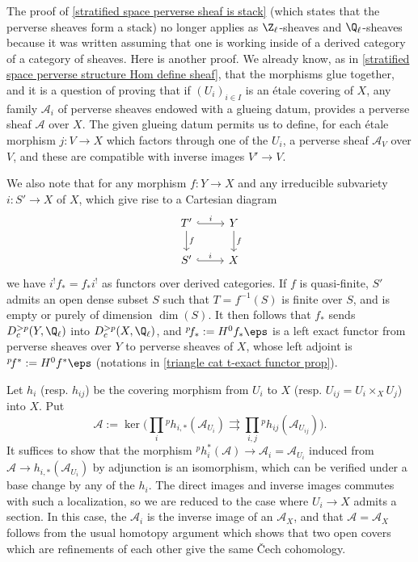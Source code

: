 \begin{remark}
The proof of \cref{stratified space perverse sheaf is stack} (which states that the perverse sheaves form a stack) no longer applies as $\Z_\ell$-sheaves and $\Q_\ell$-sheaves because it was written assuming that one is working inside of a derived category of a category of sheaves. Here is another proof. We already know, as in \cref{stratified space perverse structure Hom define sheaf}, that the morphisms glue together, and it is a question of proving that if $(U_i)_{i\in I}$ is an \'etale covering of $X$, any family $\mathscr{A}_i$ of perverse sheaves endowed with a glueing datum, provides a perverse sheaf $\mathscr{A}$ over $X$. The given glueing datum permits us to define, for each \'etale morphism $j:V\to X$ which factors through one of the $U_i$, a perverse sheaf $\mathscr{A}_V$ over $V$, and these are compatible with inverse images $V'\to V$.\par
We also note that for any morphism $f:Y\to X$ and any irreducible subvariety $i:S'\to X$ of $X$, which give rise to a Cartesian diagram
\[\begin{tikzcd}
T'\ar[r,hook,"i"]\ar[d,"f"]&Y\ar[d,"f"]\\
S'\ar[r,hook,"i"]&X
\end{tikzcd}\]
we have $i^!f_*=f_*i^!$ as functors over derived categories. If $f$ is quasi-finite, $S'$ admits an open dense subset $S$ such that $T=f^{-1}(S)$ is finite over $S$, and is empty or purely of dimension $\dim(S)$. It then follows that $f_*$ sends $D_c^{>p}(Y,\Q_\ell)$ into $D_c^{>p}(X,\Q_\ell)$, and ${^p\!f_*}:=H^0f_*\eps$ is a left exact functor from perverse sheaves over $Y$ to perverse sheaves of $X$, whose left adjoint is ${^p\!f^*}:=H^0f^*\eps$ (notations in \cref{triangle cat t-exact functor prop}).\par
Let $h_i$ (resp. $h_{ij}$) be the covering morphism from $U_i$ to $X$ (resp. $U_{ij}=U_i\times_XU_j$) into $X$. Put
\[\mathscr{A}:=\ker\Big(\prod_i{^p\!h_{i,*}(\mathscr{A}_{U_i})}\rightrightarrows\prod_{i,j}{^p\!h_{ij}}(\mathscr{A}_{U_{ij}})\Big).\]
It suffices to show that the morphism ${^p\!h_i^*}(\mathscr{A})\to\mathscr{A}_i=\mathscr{A}_{U_i}$ induced from $\mathscr{A}\to h_{i,*}(\mathscr{A}_{U_i})$ by adjunction is an isomorphism, which can be verified under a base change by any of the $h_i$. The direct images and inverse images commutes with such a localization, so we are reduced to the case where $U_i\to X$ admits a section. In this case, the $\mathscr{A}_i$ is the inverse image of an $\mathscr{A}_X$, and that $\mathscr{A}=\mathscr{A}_X$ follows from the usual homotopy argument which shows that two open covers which are refinements of each other give the same \v{C}ech cohomology.
\end{remark}


